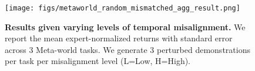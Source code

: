 \begin{figure}[h]
    \centering
    \texttt{[image: figs/metaworld\_random\_mismatched\_agg\_result.png]}
    \vskip -0.025in
    \caption{\small \textbf{Results given varying levels of temporal misalignment.} We report the mean expert-normalized returns with standard error across 3 Meta-world tasks. We generate 3 perturbed demonstrations per task per misalignment level (L=Low, H=High). 
    }
    \label{fig:meta_random_mismatched}
\end{figure}
